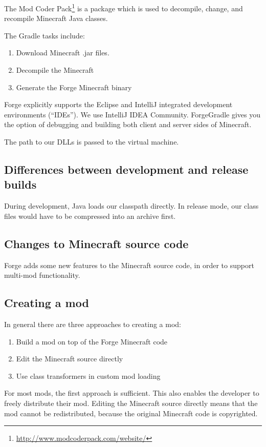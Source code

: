 \documentclass[]{article}
\begin{document}
The Mod Coder Pack\footnote{\url{http://www.modcoderpack.com/website/}} is a package which is used to decompile, change, and recompile Minecraft Java classes.

The Gradle tasks include:
\begin{enumerate}
  \item Download Minecraft .jar files.
  \item Decompile the Minecraft 
  \item Generate the Forge Minecraft binary
\end{enumerate}

Forge explicitly supports the Eclipse and IntelliJ integrated development environments (\enquote{IDEs}).
We use IntelliJ IDEA Community.
ForgeGradle gives you the option of debugging and building both client and server sides of Minecraft.

The path to our DLLs is passed to the virtual machine.

\subsection{Differences between development and release builds}
During development, Java loads our classpath directly.
In release mode, our class files would have to be compressed into an archive first.

\subsection{Changes to Minecraft source code}
Forge adds some new features to the Minecraft source code, in order to support multi-mod functionality.

\subsection{Creating a mod}
In general there are three approaches to creating a mod:
\begin{enumerate}
  \item Build a mod on top of the Forge Minecraft code
  \item Edit the Minecraft source directly
  \item Use class transformers in custom mod loading
\end{enumerate}
For most mods, the first approach is sufficient.
This also enables the developer to freely distribute their mod.
Editing the Minecraft source directly means that the mod cannot be redistributed, because the original Minecraft code is copyrighted.
\end{document}

